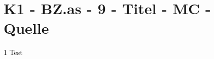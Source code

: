 \section{K1 - BZ.as - 9 - Titel - MC - Quelle}

\begin{langesbeispiel} \item[1] %
Test
\end{langesbeispiel}